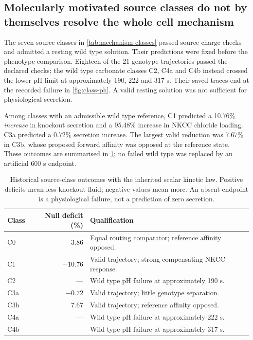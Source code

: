 \subsection{Molecularly motivated source classes do not by themselves resolve the whole cell mechanism}
\label{sec:catalan-results}

The seven source classes in \cref{tab:mechanism-classes} passed source charge checks and admitted a resting wild type solution. Their predictions were fixed before the phenotype comparison. Eighteen of the 21 genotype trajectories passed the declared checks; the wild type carbonate classes C2, C4a and C4b instead crossed the lower pH limit at approximately 190, 222 and 317 s. Their saved traces end at the recorded failure in \cref{fig:class-ph}. A valid resting solution was not sufficient for physiological secretion.

Among classes with an admissible wild type reference, C1 predicted a 10.76\% \emph{increase} in knockout secretion and a 95.48\% increase in NKCC chloride loading. C3a predicted a 0.72\% secretion increase. The largest valid reduction was 7.67\% in C3b, whose proposed forward affinity was opposed at the reference state. These outcomes are summarised in \cref{tab:class-outcomes}; no failed wild type was replaced by an artificial 600 s endpoint.

\begin{table}[t]
\centering
\caption{Historical source-class outcomes with the inherited scalar kinetic law. Positive deficits mean less knockout fluid; negative values mean more. An absent endpoint is a physiological failure, not a prediction of zero secretion.}
\label{tab:class-outcomes}
\begin{tabularx}{\textwidth}{l r X}
\toprule
Class & Null deficit (\%) & Qualification\\
\midrule
C0 & 3.86 & Equal routing comparator; reference affinity opposed.\\
C1 & $-10.76$ & Valid trajectory; strong compensating NKCC response.\\
C2 & --- & Wild type pH failure at approximately 190 s.\\
C3a & $-0.72$ & Valid trajectory; little genotype separation.\\
C3b & 7.67 & Valid trajectory; reference affinity opposed.\\
C4a & --- & Wild type pH failure at approximately 222 s.\\
C4b & --- & Wild type pH failure at approximately 317 s.\\
\bottomrule
\end{tabularx}
\end{table}

